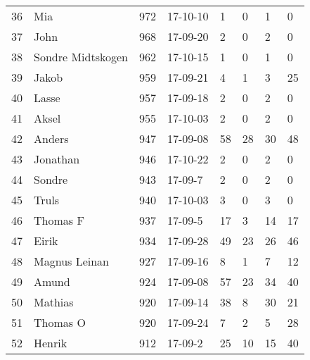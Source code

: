\begin{longtable}{|r|l|r|l|l|l|l|l|}
36 &                  Mia &   972 &    17-10-10 &               1 &     0 &       1 &         0 \\
37 &                 John &   968 &    17-09-20 &               2 &     0 &       2 &         0 \\
38 &    Sondre Midtskogen &   962 &    17-10-15 &               1 &     0 &       1 &         0 \\
39 &                Jakob &   959 &    17-09-21 &               4 &     1 &       3 &        25 \\
40 &                Lasse &   957 &    17-09-18 &               2 &     0 &       2 &         0 \\
41 &                Aksel &   955 &    17-10-03 &               2 &     0 &       2 &         0 \\
42 &               Anders &   947 &    17-09-08 &              58 &    28 &      30 &        48 \\
43 &             Jonathan &   946 &    17-10-22 &               2 &     0 &       2 &         0 \\
44 &               Sondre &   943 &     17-09-7 &               2 &     0 &       2 &         0 \\
45 &                Truls &   940 &    17-10-03 &               3 &     0 &       3 &         0 \\
46 &             Thomas F &   937 &     17-09-5 &              17 &     3 &      14 &        17 \\
47 &                Eirik &   934 &    17-09-28 &              49 &    23 &      26 &        46 \\
48 &        Magnus Leinan &   927 &    17-09-16 &               8 &     1 &       7 &        12 \\
49 &                Amund &   924 &    17-09-08 &              57 &    23 &      34 &        40 \\
50 &              Mathias &   920 &    17-09-14 &              38 &     8 &      30 &        21 \\
51 &             Thomas O &   920 &    17-09-24 &               7 &     2 &       5 &        28 \\
52 &               Henrik &   912 &     17-09-2 &              25 &    10 &      15 &        40 \\
\end{longtable}
